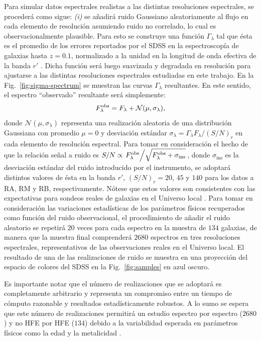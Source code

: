 Para simular datos espectrales realistas a las distintas resoluciones espectrales, se procederá como
sigue: \textit{(i)} se añadirá ruido Gaussiano aleatoriamente al flujo en cada elemento de
resolución asumiendo ruido no correlado, lo cual es observacionalmente plausible. Para esto se
construye una función $\Gamma_\lambda$ tal que ésta es el promedio de los errores reportados por el
SDSS en la espectroscopía de galaxias hasta $z=0.1$, normalizado a la unidad en la longitud de onda
efectiva de la banda $r'$ \citep{Magris2015}. Dicha función será luego suavizada y degradada en
resolución para ajustarse a las distintas resoluciones espectrales estudiadas en este trabajo. En la
Fig.~\ref{fig:sigma-spectrum} se muestran las curvas $\Gamma_\lambda$ resultantes. En este sentido,
el espectro ``observado'' resultante será simplemente:
%
\begin{equation}\label{ec:noise-flux}
\sedt[F]{obs} = {F_\lambda} + \mathcal{N}(\mu,\sigma_\lambda),
\end{equation}
%
donde $\mathcal{N}(\mu,\sigma_\lambda)$ representa una realización aleatoria de una distribución
Gaussiana con promedio $\mu=0$ y desviación estándar $\sigma_\lambda=\Gamma_\lambda
F_\lambda/(S/N)_r$ en cada elemento de resolución espectral. Para tomar en consideración el hecho de
que la relación señal a ruido es $S/N\propto
\left.\sedt[F]{obs}\middle/\sqrt{\sedt[F]{obs}+\sigma_\text{ins}}\right.$, donde $\sigma_\text{ins}$
es la desviación estándar del ruido introducido por el instrumento, se adoptará distintos valores de
ésta en la banda $r'$, $(S/N)_r=20$, $45$ y $140$ para los datos a RA, RM y RB, respectivamente.
Nótese que estos valores son consistentes con las expectativas para sondeos reales de galaxias en el
Universo local \citep{Benitez2014, Howell2006}. Para tomar en consideración las variaciones
estadísticas de los parámetros físicos recuperados como función del ruido observacional, el
procedimiento de añadir el ruido aleatorio se repetirá $20$ veces para cada espectro en la muestra
de $134$ galaxias, de manera que la muestra final comprenderá $2680$ espectros en tres resoluciones
espectrales, representativos de las observaciones reales en el Universo local. El resultado de una
de las realizaciones de ruido se muestra en una proyección del espacio de colores del SDSS en la
Fig.~\ref{fig:samples} en azul oscuro.

Es importante notar que el número de realizaciones que se adoptará es completamente arbitrario y
representa un compromiso entre un tiempo de cómputo razonable y resultados estadísticamente
robustos. A lo sumo se espera que este número de realizaciones permitirá un estudio espectro por
espectro ($2680$) y no HFE por HFE ($134$) debido a la variabilidad esperada en parámetros físicos
como la edad y la metalicidad \citep[\eg,][]{Magris2015}.

